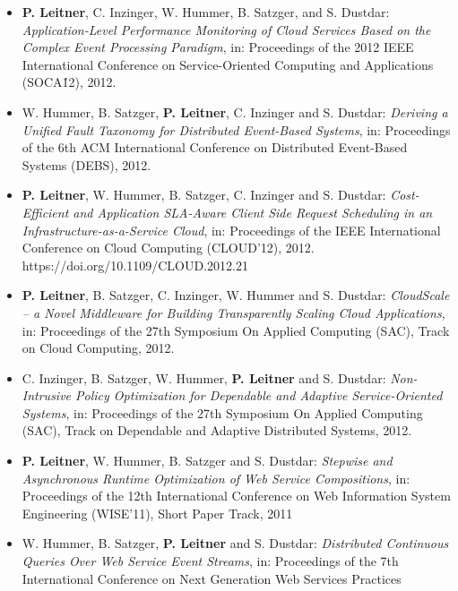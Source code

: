 \documentclass[paper=letter,fontsize=11pt]{scrartcl} %
\begin{document}
\begin{itemize}
\emph{Identifying Incompatible Service Implementations using Pooled Decision Trees},  in: Proceedings of the 28th Symposium on Applied Computing (SAC), Track on Dependable and Adaptive Distributed Systems, 2013. 
\item \textbf{P. Leitner}, C. Inzinger, W. Hummer, B. Satzger, and S. Dustdar:
\emph{Application-Level Performance Monitoring of Cloud Services Based on the Complex Event Processing Paradigm}, in: Proceedings of the 2012 IEEE International Conference on Service-Oriented Computing and Applications (SOCA\'12), 2012. 
\item W. Hummer, B. Satzger, \textbf{P. Leitner}, C. Inzinger and S. Dustdar:
\emph{Deriving a Unified Fault Taxonomy for Distributed Event-Based Systems}, in: Proceedings of the 6th ACM International Conference on Distributed Event-Based Systems (DEBS), 2012. 
\item \textbf{P. Leitner}, W. Hummer, B. Satzger, C. Inzinger and S. Dustdar:
\emph{Cost-Efficient and Application SLA-Aware Client Side Request Scheduling in an Infrastructure-as-a-Service Cloud}, in: Proceedings of the IEEE International Conference on Cloud Computing (CLOUD'12), 2012. https://doi.org/10.1109/CLOUD.2012.21
\item \textbf{P. Leitner}, B. Satzger, C. Inzinger, W. Hummer and S. Dustdar:
\emph{CloudScale -- a Novel Middleware for Building Transparently Scaling
Cloud Applications}, in: Proceedings of the 27th Symposium On Applied Computing (SAC),
Track on Cloud Computing, 2012. \\ 
\item C. Inzinger, B. Satzger, W. Hummer, \textbf{P. Leitner} and S. Dustdar:
\emph{Non-Intrusive Policy Optimization for Dependable and Adaptive Service-Oriented Systems}, in: Proceedings of the 27th Symposium On Applied Computing (SAC),
Track on Dependable and Adaptive Distributed Systems, 2012. 
\item \textbf{P. Leitner}, W. Hummer, B. Satzger and S. Dustdar:
\emph{Stepwise and Asynchronous Runtime Optimization of Web Service
Compositions}, in: Proceedings of the 12th International Conference on Web
Information System Engineering (WISE'11), Short Paper Track, 2011
\item W. Hummer, B. Satzger, \textbf{P. Leitner} and S. Dustdar:
\emph{Distributed Continuous Queries Over Web Service Event Streams}, in: Proceedings of the 7th International Conference on Next Generation Web Services Practices

\end{itemize}
\end{document}
